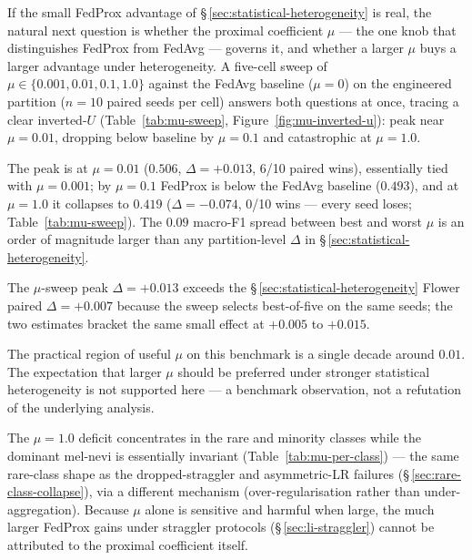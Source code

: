 \documentclass[11pt,a4paper]{report}
\begin{document}
If the small FedProx advantage of \S\,\ref{sec:statistical-heterogeneity} is
real, the natural next question is whether the proximal coefficient $\mu$ ---
the one knob that distinguishes FedProx from FedAvg --- governs it, and whether
a larger $\mu$ buys a larger advantage under heterogeneity. A five-cell sweep
of $\mu \in \{0.001, 0.01, 0.1, 1.0\}$ against the FedAvg
baseline ($\mu = 0$) on the engineered partition ($n=10$ paired seeds per
cell) answers both questions at once, tracing a clear inverted-$U$
(Table~\ref{tab:mu-sweep},
Figure~\ref{fig:mu-inverted-u}): peak near $\mu = 0.01$, dropping below
baseline by $\mu = 0.1$ and catastrophic at $\mu = 1.0$.

The peak is at $\mu = 0.01$ ($0.506$, $\Delta = +0.013$, 6/10 paired wins),
essentially tied with $\mu = 0.001$; by $\mu = 0.1$ FedProx is below the FedAvg
baseline ($0.493$), and at $\mu = 1.0$ it collapses to $0.419$
($\Delta = -0.074$, 0/10 wins --- every seed loses; Table~\ref{tab:mu-sweep}).
The $0.09$ macro-F1 spread between best and worst $\mu$ is an order of magnitude
larger than any partition-level $\Delta$ in
\S\,\ref{sec:statistical-heterogeneity}.

The $\mu$-sweep peak $\Delta = +0.013$ exceeds the
\S\,\ref{sec:statistical-heterogeneity} Flower paired $\Delta = +0.007$
because the sweep selects best-of-five on the same seeds; the two estimates
bracket the same small effect at $+0.005$ to $+0.015$.

The practical region of useful $\mu$ on this benchmark is a single decade
around $0.01$. The expectation that larger $\mu$ should be preferred under
stronger statistical heterogeneity is not supported here --- a benchmark
observation, not a refutation of the underlying analysis.

The $\mu = 1.0$ deficit concentrates in the rare and minority classes while the
dominant mel-nevi is essentially invariant (Table~\ref{tab:mu-per-class}) --- the
same rare-class shape as the dropped-straggler and asymmetric-LR failures
(\S\,\ref{sec:rare-class-collapse}), via a different mechanism
(over-regularisation rather than under-aggregation). Because $\mu$ alone is
sensitive and harmful when large, the much larger FedProx gains under straggler
protocols (\S\,\ref{sec:li-straggler}) cannot be attributed to the proximal
coefficient itself.


\end{document}
